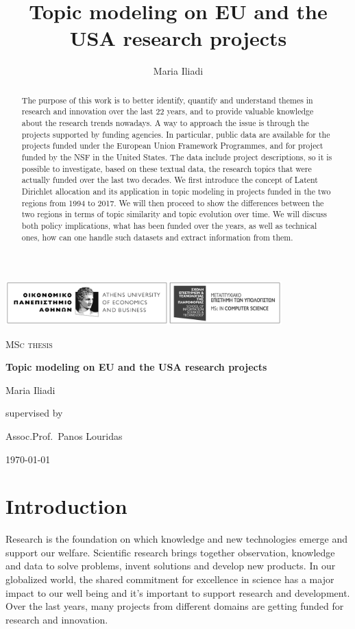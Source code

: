 \documentclass[12pt]{report}
\title{Topic modeling on EU and the USA research projects}
\author{Maria Iliadi}
\begin{document}
\begin{titlepage}
	\centering
	\includegraphics[width=0.8\textwidth]{figs/logo.jpg}\par\vspace{4cm}
	{\scshape\Large MSc thesis\par}
	\vspace{1.5cm}
	{\Large\bfseries Topic modeling on EU and the USA research projects\par}
	\vspace{2cm}
	{\Large Maria Iliadi\par}
	\vfill
	supervised by\par
	Assoc.Prof.~Panos Louridas

	\vfill

	{\large \today\par}
\end{titlepage}
\tableofcontents

\begin{abstract}
The purpose of this work is to better identify, quantify and understand themes
in research and innovation over the last 22 years, and to provide valuable
knowledge about the research trends nowadays. A way to approach the issue is
through the projects supported by funding agencies. In particular, public data
are available for the projects funded under the European Union Framework
Programmes, and for project funded by the NSF in the United States. The data
include project descriptions, so it is possible to investigate, based on these
textual data, the research topics that were actually funded over the last two
decades. We first introduce the concept of Latent Dirichlet allocation and its
application in topic modeling in projects funded in the two regions from 1994
to 2017. We will then proceed to show the differences between the two regions in
terms of topic similarity and topic evolution over time. We will discuss both
policy implications, what has been funded over the years, as well as technical
ones, how can one handle such datasets and extract information from them.
\end{abstract}


\section{Introduction}
Research is the foundation on which knowledge and new technologies emerge and
support our welfare. Scientific research brings together observation, knowledge
and data to solve problems, invent solutions and develop new products. In our
globalized world, the shared commitment for excellence in science has a major
impact to our well being and it's important to support research and development.
Over the last years, many projects from different domains are getting funded for
research and innovation.
\end{document}
